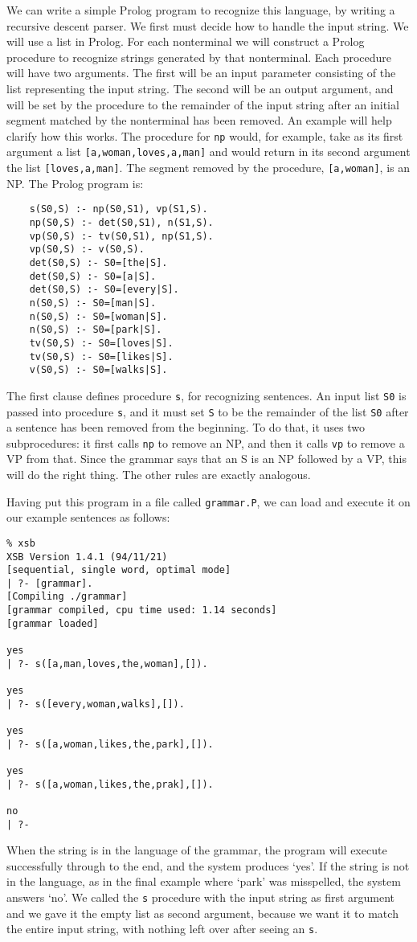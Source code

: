 We can write a simple Prolog program to recognize this language, by
writing a recursive descent parser.  We first must decide how to
handle the input string.  We will use a list in Prolog.  For each
nonterminal we will construct a Prolog procedure to recognize strings
generated by that nonterminal.  Each procedure will have two
arguments.  The first will be an input parameter consisting of the
list representing the input string.  The second will be an output
argument, and will be set by the procedure to the remainder of the
input string after an initial segment matched by the nonterminal has
been removed.  An example will help clarify how this works.  The
procedure for \verb|np| would, for example, take as its first argument
a list \verb|[a,woman,loves,a,man]| and would return in its second
argument the list \verb|[loves,a,man]|.  The segment removed by the
procedure, \verb|[a,woman]|, is an NP.  The Prolog program is:
\begin{verbatim}
    s(S0,S) :- np(S0,S1), vp(S1,S).
    np(S0,S) :- det(S0,S1), n(S1,S).
    vp(S0,S) :- tv(S0,S1), np(S1,S).
    vp(S0,S) :- v(S0,S).
    det(S0,S) :- S0=[the|S].
    det(S0,S) :- S0=[a|S].
    det(S0,S) :- S0=[every|S].
    n(S0,S) :- S0=[man|S].
    n(S0,S) :- S0=[woman|S].
    n(S0,S) :- S0=[park|S].
    tv(S0,S) :- S0=[loves|S].
    tv(S0,S) :- S0=[likes|S].
    v(S0,S) :- S0=[walks|S].
\end{verbatim}
The first clause defines procedure \verb|s|, for recognizing
sentences.  An input list \verb|S0| is passed into procedure \verb|s|,
and it must set \verb|S| to be the remainder of the list \verb|S0|
after a sentence has been removed from the beginning.  To do that, it
uses two subprocedures: it first calls \verb|np| to remove an NP, and
then it calls \verb|vp| to remove a VP from that.  Since the grammar
says that an S is an NP followed by a VP, this will do the right
thing.  The other rules are exactly analogous.

Having put this program in a file called \verb|grammar.P|, we can load
and execute it on our example sentences as follows:
\begin{verbatim}
% xsb
XSB Version 1.4.1 (94/11/21)
[sequential, single word, optimal mode]
| ?- [grammar].
[Compiling ./grammar]
[grammar compiled, cpu time used: 1.14 seconds]
[grammar loaded]

yes
| ?- s([a,man,loves,the,woman],[]).

yes
| ?- s([every,woman,walks],[]).

yes
| ?- s([a,woman,likes,the,park],[]).

yes
| ?- s([a,woman,likes,the,prak],[]).

no
| ?- 
\end{verbatim}
When the string is in the language of the grammar, the program will
execute successfully through to the end, and the system produces
`yes'.  If the string is not in the language, as in the final example
where `park' was misspelled, the system answers `no'.  We called the
\verb|s| procedure with the input string as first argument and we gave
it the empty list as second argument, because we want it to match the
entire input string, with nothing left over after seeing an \verb|s|.

